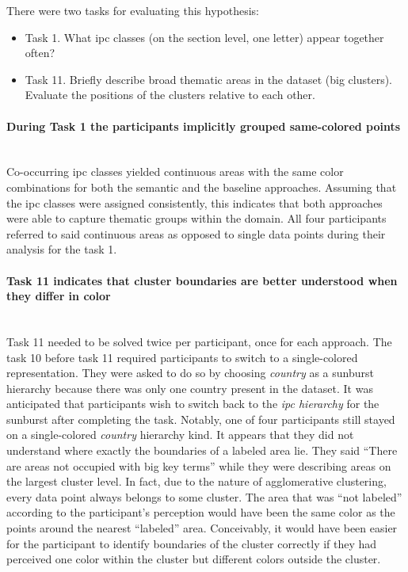 There were two tasks for evaluating this hypothesis:
\begin{itemize}
	\item Task 1. What \gls{ipc} classes (on the section level, one letter) appear together often?
	\item Task 11. Briefly describe broad thematic areas in the dataset (big clusters). Evaluate the positions of the clusters relative to each other.
\end{itemize}

\paragraph{During Task 1 the participants implicitly grouped same-colored points}~\\
Co-occurring \gls{ipc} classes yielded continuous areas with the same color combinations for both the semantic and the baseline approaches.
Assuming that the \gls{ipc} classes were assigned consistently, this indicates that both approaches were able to capture thematic groups within the domain.
All four participants referred to said continuous areas as opposed to single data points during their analysis for the task 1.
 
 \paragraph{Task 11 indicates that cluster boundaries are better understood when they differ in color}~\\
Task 11 needed to be solved twice per participant, once for each approach. 
The task 10 before task 11 required participants to switch to a single-colored representation.
They were asked to do so by choosing \textit{country} as a sunburst hierarchy because there was only one country present in the dataset.
It was anticipated that participants wish to switch back to the \textit{\gls{ipc} hierarchy} for the sunburst after completing the task.
Notably, one of four participants still stayed on a single-colored \textit{country} hierarchy kind.
It appears that they did not understand where exactly the boundaries of a labeled area lie.
They said ``There are areas not occupied with big key terms'' while they were describing areas on the largest cluster level.
In fact, due to the nature of agglomerative clustering, every data point always belongs to some cluster.
The area that was ``not labeled'' according to the participant's perception would have been the same color as the points around the nearest ``labeled'' area.
Conceivably, it would have been easier for the participant to identify boundaries of the cluster correctly if they had perceived one color within the cluster but different colors outside the cluster.

